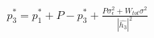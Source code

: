 \documentclass[preview]{standalone}
\begin{document}
\begin{align*}
p_3^\ast = p_1^\ast + P - p_3^\ast + \frac{P \sigma_\epsilon^2 + W_{tot} \sigma^2}{\left|\hat{h_3}\right|^2}
\end{align*}
\end{document}
